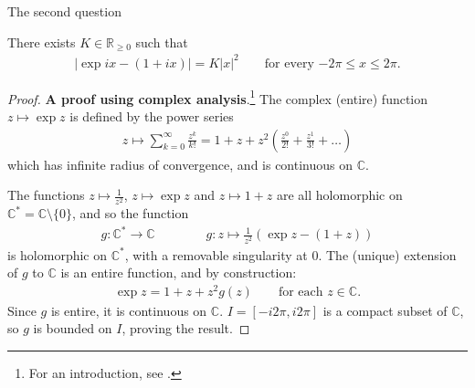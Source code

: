 \documentclass[main.tex]{subfiles}
\begin{document}
The second question  


\begin{lemma}\label{lem:expaprrox}
There exists $K \in \mathbb{R}_{\geq 0}$ such that
\begin{align*}
    |\exp ix - (1 + ix)| = K |x|^2 \qquad \text{for every $-2\pi \leq x \leq 2\pi$}.
\end{align*}
\end{lemma}

\begin{proof}
\textbf{A proof using complex analysis}.\footnote{For an introduction, see \cite{GarlingVolIII}.} The complex (entire) function $z \mapsto \exp z$ is defined by the power series
\begin{align*}
    z\mapsto \sum_{k=0}^{\infty} \frac{z^k}{k!} = 1 + z + z^2\left(\frac{z^0}{2!}+\frac{z^1}{3!}+\dots\right)
\end{align*}
which has infinite radius of convergence, and is continuous on $\mathbb{C}$. 

The functions $z \mapsto \frac{1}{z^2}$, $z \mapsto \exp z$ and $z \mapsto 1+z$ are all holomorphic on $\mathbb{C}^*=\mathbb{C} \setminus \{0\}$, and so the function
\begin{align}
    g: \mathbb{C}^* \rightarrow \mathbb{C} \qquad \qquad
    g: z \mapsto \frac{1}{z^2}(\exp z - (1+z))
\end{align}
is holomorphic on $\mathbb{C}^*$, with a removable singularity at $0$. The (unique) extension of $g$ to $\mathbb{C}$ is an entire function, and by construction:
\begin{align*}
    \exp z = 1 + z + z^2g(z)\qquad \text{for each $z \in \mathbb{C}$}.
\end{align*}
Since $g$ is entire, it is continuous on $\mathbb{C}$.
$I=[-i2\pi, i2\pi]$ is a compact subset of $\mathbb{C}$, so $g$ is bounded on $I$, proving the result.
\end{proof}
\end{document}
